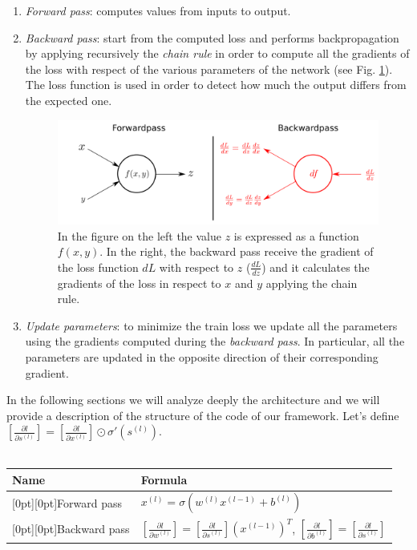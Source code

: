 \documentclass[journal, a4paper]{IEEEtran}
\begin{document}
\begin{enumerate}
    \item \textit{Forward pass}:
computes values from inputs to output.
 \item \textit{Backward pass}:
start from the computed loss and performs backpropagation by applying recursively the \textit{chain rule} in order to compute all the gradients of the loss with respect of the various parameters of the network (see Fig. \ref{fig:forback}). The loss function is used in order to detect how much the output differs from the expected one.
\begin{figure}
    \centering
    \includegraphics[width=0.99\linewidth]{forback.png}
    \caption{In the figure on the left the value $z$ is expressed as a function $f(x, y)$. In the right, the backward pass receive the gradient of the loss function $dL$ with respect to $z$ ($\frac{dL}{dz}$) and it calculates the gradients of the loss in respect to $x$ and $y$ applying the chain rule. \cite{reference0}}
    \label{fig:forback}
\end{figure}
\item \textit{Update parameters}:
to minimize the train loss we update all the parameters using the gradients computed during the \textit{backward pass}. In particular, all the parameters are updated in the opposite direction of their corresponding gradient.
\end{enumerate}
In the following sections we will analyze deeply the architecture and we will provide a description of the structure of the code of our framework.
Let's define $\left[ \frac{\partial l}{\partial s^{(l)}}\right] = \left[ \frac{\partial l}{\partial x^{(l)}}\right] \odot \sigma ' (s^{(l)})$.
\\
\\
\begin{tabular}{*{2}{l} }
  \toprule
  \textbf{Name} & \textbf{Formula} \\
  \midrule
  \raisebox{-.01\normalbaselineskip}[0pt][0pt]{Forward pass} &
    $x^{(l)} = \sigma (w^{(l)}x^{(l-1)} + b^{(l)})$\\
  \raisebox{-.01\normalbaselineskip}[0pt][0pt]{Backward pass} &
    $\left[\frac{\partial l}{\partial w^{(l)}}\right] =\left[\frac{\partial l}{\partial s^{(l)}} \right] \left( x^{(l-1)}\right)^T$, $\left[\frac{\partial l}{\partial b^{(l)}}\right] = \left[\frac{\partial l}{\partial s^{(l)}}\right]$\\
  \bottomrule
\end{tabular}
\end{document}
